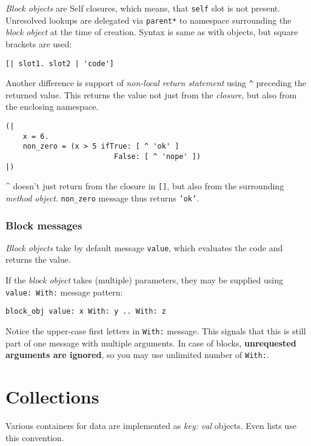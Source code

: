 \documentclass[10pt]{article}
\begin{document}
\begin{multicols*}{3}
\textit{Block objects} are Self closures, which means, that \texttt{self} slot is not present. Unresolved lookups are delegated via \texttt{parent*} to namespace surrounding the \textit{block object} at the time of creation. Syntax is same as with objects, but square brackets are used:

\begin{lstlisting}
[| slot1. slot2 | 'code']
\end{lstlisting}


Another difference is support of \textit{non-local return statement} using \texttt{\^} preceding the returned value. This returns the value not just from the \textit{closure}, but also from the enclosing namespace.

\begin{lstlisting}
(|
    x = 6.
    non_zero = (x > 5 ifTrue: [ ^ 'ok' ]
                         False: [ ^ 'nope' ])
|)
\end{lstlisting}

\^{} doesn't just return from the closure in \texttt{[]}, but also from the surrounding \textit{method object}. \texttt{non\_zero} message thus returns \texttt{'ok'}.



\subsubsection{Block messages}

\textit{Block objects} take by default message \texttt{value}, which evaluates the code and returns the value.

If the \textit{block object} takes (multiple) parameters, they may be supplied using \texttt{value:\ With:} message pattern:

\begin{lstlisting}
block_obj value: x With: y .. With: z
\end{lstlisting}

Notice the upper-case first letters in \texttt{With:} message. This signals that this is still part of one message with multiple arguments. In case of blocks, \textbf{unrequested arguments are ignored}, so you may use unlimited number of \texttt{With:}.




\pagebreak %
\section{Collections}
Various containers for data are implemented as \textit{key: val} objects. Even lists use this convention.


\end{multicols*}
\end{document}
